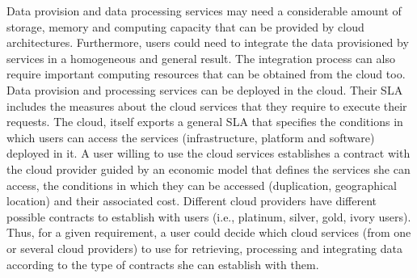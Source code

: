 

Data provision and data processing services may need a considerable amount of storage, memory and computing capacity that can be provided by cloud architectures. Furthermore, users could need to integrate the data provisioned by services in a homogeneous and general result. The integration process can also require important computing resources that can be obtained from the cloud too. Data provision and processing services can be deployed in the cloud. Their SLA includes the measures about the cloud services that they require to execute their requests. The cloud, itself exports a general SLA that specifies the conditions in which users can access the services (infrastructure, platform and software) deployed in it. A user willing to use the cloud services establishes a contract with the cloud provider guided by an economic model that defines the services she can access, the conditions in which they can be accessed (duplication, geographical location) and their associated cost. Different cloud providers have different possible contracts to establish with users (i.e., platinum, silver, gold, ivory users). Thus, for a given requirement, a user could decide which cloud services (from one or several cloud providers) to use for retrieving, processing and integrating data according to the type of contracts she can establish with them.

